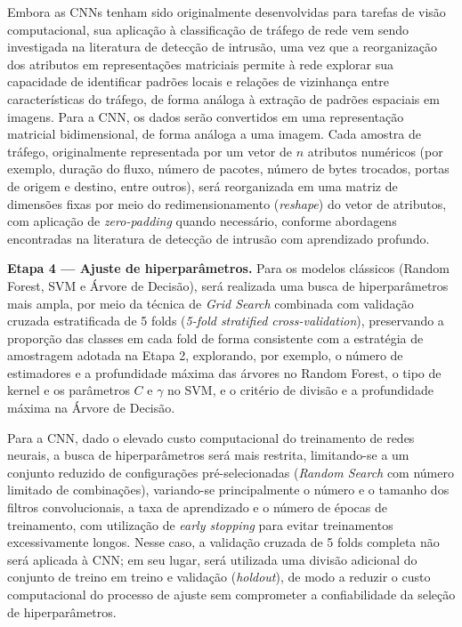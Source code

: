 Embora as CNNs tenham sido originalmente desenvolvidas para tarefas de visão computacional, sua aplicação à classificação de tráfego de rede vem sendo investigada na literatura de detecção de intrusão, uma vez que a reorganização dos atributos em representações matriciais permite à rede explorar sua capacidade de identificar padrões locais e relações de vizinhança entre características do tráfego, de forma análoga à extração de padrões espaciais em imagens. Para a CNN, os dados serão convertidos em uma representação matricial bidimensional, de forma análoga a uma imagem. Cada amostra de tráfego, originalmente representada por um vetor de $n$ atributos numéricos (por exemplo, duração do fluxo, número de pacotes, número de bytes trocados, portas de origem e destino, entre outros), será reorganizada em uma matriz de dimensões fixas por meio do redimensionamento (\textit{reshape}) do vetor de atributos, com aplicação de \textit{zero-padding} quando necessário, conforme abordagens encontradas na literatura de detecção de intrusão com aprendizado profundo.

\textbf{Etapa 4 — Ajuste de hiperparâmetros.} Para os modelos clássicos (Random Forest, SVM e Árvore de Decisão), será realizada uma busca de hiperparâmetros mais ampla, por meio da técnica de \textit{Grid Search} combinada com validação cruzada estratificada de 5 folds (\textit{5-fold stratified cross-validation}), preservando a proporção das classes em cada fold de forma consistente com a estratégia de amostragem adotada na Etapa 2, explorando, por exemplo, o número de estimadores e a profundidade máxima das árvores no Random Forest, o tipo de kernel e os parâmetros $C$ e $\gamma$ no SVM, e o critério de divisão e a profundidade máxima na Árvore de Decisão.

Para a CNN, dado o elevado custo computacional do treinamento de redes neurais, a busca de hiperparâmetros será mais restrita, limitando-se a um conjunto reduzido de configurações pré-selecionadas (\textit{Random Search} com número limitado de combinações), variando-se principalmente o número e o tamanho dos filtros convolucionais, a taxa de aprendizado e o número de épocas de treinamento, com utilização de \textit{early stopping} para evitar treinamentos excessivamente longos. Nesse caso, a validação cruzada de 5 folds completa não será aplicada à CNN; em seu lugar, será utilizada uma divisão adicional do conjunto de treino em treino e validação (\textit{holdout}), de modo a reduzir o custo computacional do processo de ajuste sem comprometer a confiabilidade da seleção de hiperparâmetros.

